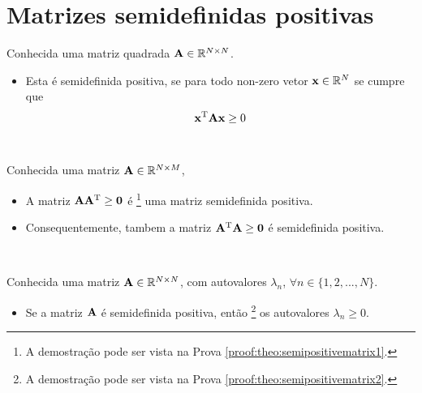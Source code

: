 \section{ Matrizes semidefinidas positivas}

\begin{definition}\label{def:semipositivematrix0}
Conhecida uma matriz quadrada $\MATRIX{A} \in \mathbb{R}^{N \times N}$. 
\begin{itemize}
\item Esta é semidefinida positiva, se para todo non-zero vetor $\VECTOR{x} \in \mathbb{R}^N$
se cumpre que \cite[pp. 159]{golub2013matrix} 
\begin{equation}
\VECTOR{x}^{\transpose} \MATRIX{A} \VECTOR{x} \geq 0
\end{equation}
\end{itemize}
\end{definition}

~

\begin{theorem}\label{theo:semipositivematrix1}
Conhecida uma matriz $\MATRIX{A} \in \mathbb{R}^{N \times M}$, 
\begin{itemize}
\item A matriz $\MATRIX{A}\MATRIX{A}^{\transpose} \geq \MATRIX{0}$ é
\footnote{A demostração pode ser vista na Prova \ref{proof:theo:semipositivematrix1}.} 
uma matriz semidefinida positiva.
\item Consequentemente, tambem a matriz $\MATRIX{A}^{\transpose}\MATRIX{A}  \geq \MATRIX{0}$ é semidefinida positiva.
\end{itemize}
\end{theorem}

~

\begin{theorem}\label{theo:semipositivematrix2}
Conhecida uma matriz $\MATRIX{A} \in \mathbb{R}^{N \times N}$, com  autovalores $\lambda_n$,
$\forall n \in \{1, 2, ..., N\}$.
\begin{itemize}
\item Se a matriz $\MATRIX{A}$ é semidefinida positiva, então
\footnote{A demostração pode ser vista na Prova \ref{proof:theo:semipositivematrix2}.} 
os autovalores $\lambda_n \geq 0$.
\end{itemize}
\end{theorem}

